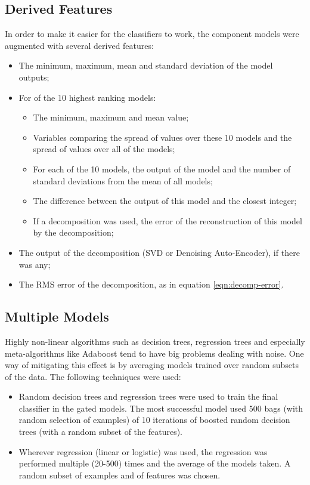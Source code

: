 \documentclass{article}
\begin{document}
\subsection{Derived Features}

In order to make it easier for the classifiers to work, the component models were augmented with several derived features:

\begin{itemize}
\item The minimum, maximum, mean and standard deviation of the model outputs;
\item For of the 10 highest ranking models:
  \begin{itemize}
    \item The minimum, maximum and mean value;
    \item Variables comparing the spread of values over these 10 models and the spread of values over all of the models;
    \item For each of the 10 models, the output of the model and the number of standard deviations from the mean of all models;
    \item The difference between the output of this model and the closest integer;
    \item If a decomposition was used, the error of the reconstruction of this model by the decomposition;
  \end{itemize}
\item The output of the decomposition (SVD or Denoising Auto-Encoder), if there was any;
\item The RMS error of the decomposition, as in equation \ref{eqn:decomp-error}.

\end{itemize}

\subsection{Multiple Models}

Highly non-linear algorithms such as decision trees, regression trees and especially meta-algorithms like Adaboost tend to have big problems dealing with noise.
One way of mitigating this effect is by averaging models trained over random subsets of the data.  The following techniques were used:

\begin{itemize}
\item Random decision trees and regression trees were used to train the final classifier in the gated models.  The most successful model used 500 bags (with random selection of examples) of 10 iterations of boosted random decision trees (with a random subset of the features).
\item Wherever regression (linear or logistic) was used, the regression was performed multiple (20-500) times and the average of the models taken.  A random subset of examples and of features was chosen.
\end{itemize}
\end{document}
